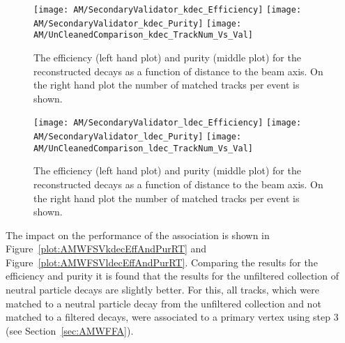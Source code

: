 \begin{figure}[!ht]
  \centering
  \texttt{[image: AM/SecondaryValidator\_kdec\_Efficiency]}
  \texttt{[image: AM/SecondaryValidator\_kdec\_Purity]}
  \texttt{[image: AM/UnCleanedComparison\_kdec\_TrackNum\_Vs\_Val]}
  \caption[Purity and efficiency of the reconstructed \PKzS{} decays as a function of distance to the beam axis and number of matched tracks]{The efficiency (left hand plot) and purity (middle plot) for the reconstructed \PKzS{} decays as a function of distance to the beam axis. On the right hand plot the number of matched tracks per event is shown. \label{plot:AMWFSVkdecEffAndPurDC}}
\end{figure}
\begin{figure}[!ht]
  \centering
  \texttt{[image: AM/SecondaryValidator\_ldec\_Efficiency]}
  \texttt{[image: AM/SecondaryValidator\_ldec\_Purity]}
  \texttt{[image: AM/UnCleanedComparison\_ldec\_TrackNum\_Vs\_Val]}
  \caption[Purity and efficiency of the reconstructed \PgL{} decays as a function of distance to the beam axis and number of matched tracks]{The efficiency (left hand plot) and purity (middle plot) for the reconstructed \PgL{} decays as a function of distance to the beam axis. On the right hand plot the number of matched tracks per event is shown. \label{plot:AMWFSVldecEffAndPurDC}}
\end{figure}

The impact on the performance of the association is shown in Figure~\ref{plot:AMWFSVkdecEffAndPurRT} and Figure~\ref{plot:AMWFSVldecEffAndPurRT}. Comparing the results for the efficiency and purity it is found that the results for the unfiltered collection of neutral particle decays are slightly better. For this, all tracks, which were matched to a neutral particle decay from the unfiltered collection and not matched to a filtered decays, were associated to a primary vertex using step 3 (see Section~\ref{sec:AMWFFA}).

